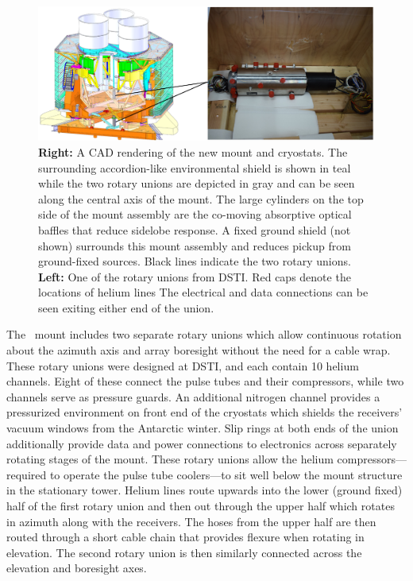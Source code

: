 \documentclass[]{spie}  %
\begin{document}
\begin{figure} [hb]
	\begin{center}
		\includegraphics{mount.png}
	\end{center}
	\caption{\textbf{Right:} A CAD rendering of the new \biceparray mount and cryostats. The surrounding
	accordion-like environmental shield is shown in teal while the two rotary
	unions are depicted in gray and can be seen along the central axis of the
	mount. The large cylinders on the top side of the mount assembly are
	the co-moving absorptive optical baffles that reduce sidelobe response. A fixed
	ground shield (not shown) surrounds this mount assembly and reduces pickup from
	ground-fixed sources. Black lines indicate the two rotary unions.
	\textbf{Left:} One of the rotary unions from DSTI. Red caps denote the
	locations of helium lines The electrical and data connections
	can be seen exiting either end of the union.}
	\label{fig:bamount}
\end{figure}


The \biceparray\ mount includes two separate rotary unions which allow
continuous rotation about the azimuth axis and array boresight without the need for a
cable wrap. These rotary unions were designed at DSTI, and each contain 10
helium channels. Eight of these connect the pulse tubes and their compressors,
while two channels serve as pressure guards. An additional nitrogen channel
provides a pressurized environment on front end of the cryostats which shields
the receivers' vacuum windows from the Antarctic winter.  Slip rings at both
ends of the union additionally provide data and power connections to
electronics across separately rotating stages of the mount. These rotary unions
allow the helium compressors---required to operate the pulse tube coolers---to
sit well below the mount structure in the stationary tower. Helium lines route
upwards into the lower (ground fixed) half of the first rotary union and then
out through the upper half which rotates in azimuth along with the receivers.
The hoses from the upper half are then routed through a short cable chain that
provides flexure when rotating in elevation. The second rotary union is then
similarly connected across the elevation and boresight axes.
\end{document}
